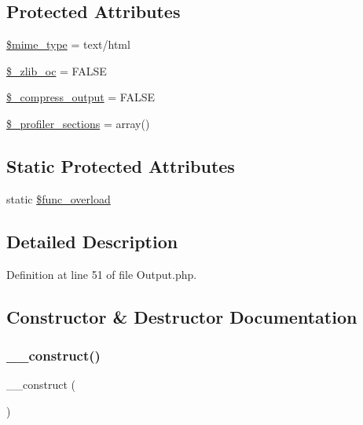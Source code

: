 \subsection*{Protected Attributes}
\begin{DoxyCompactItemize}
\item 
\mbox{\hyperlink{class_c_i___output_a4d1985caafb49b059e3ca3dedfee257a}{\$mime\+\_\+type}} = \textquotesingle{}text/html\textquotesingle{}
\item 
\mbox{\hyperlink{class_c_i___output_a76d91b71069ec82a31b4d12643e0ca40}{\$\+\_\+zlib\+\_\+oc}} = F\+A\+L\+SE
\item 
\mbox{\hyperlink{class_c_i___output_a9b8f5f282f8cf7b10d1b03b219df1386}{\$\+\_\+compress\+\_\+output}} = F\+A\+L\+SE
\item 
\mbox{\hyperlink{class_c_i___output_a4d239124375bbbdb9a4f5a0260505c40}{\$\+\_\+profiler\+\_\+sections}} = array()
\end{DoxyCompactItemize}
\subsection*{Static Protected Attributes}
\begin{DoxyCompactItemize}
\item 
static \mbox{\hyperlink{class_c_i___output_aef84be58d58a5895572c5689e56a1047}{\$func\+\_\+overload}}
\end{DoxyCompactItemize}


\subsection{Detailed Description}


Definition at line 51 of file Output.\+php.



\subsection{Constructor \& Destructor Documentation}
\mbox{\label{class_c_i___output_a095c5d389db211932136b53f25f39685}} 
\subsubsection{\texorpdfstring{\_\_construct()}{\_\_construct()}}
{\footnotesize\ttfamily \+\_\+\+\_\+construct (\begin{DoxyParamCaption}{ }\end{DoxyParamCaption})}

